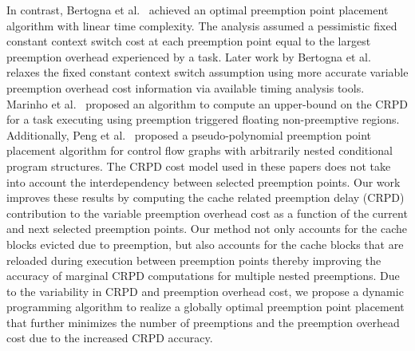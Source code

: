In contrast, Bertogna et al.~\cite{bertogna:10} achieved an optimal preemption point placement algorithm with linear time complexity.  The analysis assumed a pessimistic fixed constant context switch cost at each preemption point equal to the largest preemption overhead experienced by a task.  Later work by Bertogna et al.~\cite{bertogna:11} relaxes the fixed constant context switch assumption using more accurate variable preemption overhead cost information via available timing analysis tools. Marinho et al.~\cite{marinho:12} proposed an algorithm to compute an upper-bound on the CRPD for a task executing using preemption triggered floating non-preemptive regions. Additionally, Peng et al.~\cite{peng:14} proposed a pseudo-polynomial preemption point placement algorithm for control flow graphs with arbitrarily nested conditional program structures.  The CRPD cost model used in these papers does not take into account the interdependency between selected preemption points.
\newline
\indent
Our work improves these results by computing the cache related preemption delay (CRPD) contribution to the variable preemption overhead cost as a function of the current and next selected preemption points.  Our method not only accounts for the cache blocks evicted due to preemption, but also accounts for the cache blocks that are reloaded during execution between preemption points thereby improving the accuracy of marginal CRPD computations for multiple nested preemptions.
Due to the variability in CRPD and preemption overhead cost, we propose a dynamic programming algorithm to realize a globally optimal preemption point placement that further minimizes the number of preemptions and the preemption overhead cost due to the increased CRPD accuracy.
